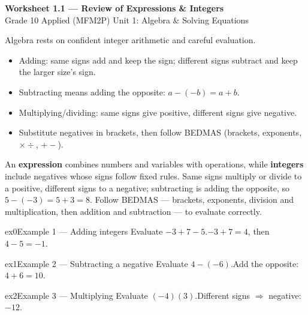 \documentclass[11pt]{article}
\begin{document}
\begin{center}
{\LARGE\bfseries\color{titleblue}Worksheet 1.1 --- Review of Expressions \& Integers}\\[2pt]
{\small Grade 10 Applied (MFM2P) \textperiodcentered{} Unit 1: Algebra \& Solving Equations}
\end{center}

\begin{ideabox}
Algebra rests on confident integer arithmetic and careful evaluation.
\begin{itemize}[leftmargin=*,itemsep=2pt]
  \item Adding: same signs add and keep the sign; different signs subtract and keep the larger size's sign.
  \item Subtracting means adding the opposite: $a-(-b)=a+b$.
  \item Multiplying/dividing: same signs give positive, different signs give negative.
  \item Substitute negatives in brackets, then follow BEDMAS (brackets, exponents, $\times\div$, $+-$).
\end{itemize}
\end{ideabox}

\begin{learnbox}
An \textbf{expression} combines numbers and variables with operations, while \textbf{integers} include negatives whose signs follow fixed rules.
Same signs multiply or divide to a positive, different signs to a negative; subtracting is adding the opposite, so $5-(-3)=5+3=8$.
Follow BEDMAS — brackets, exponents, division and multiplication, then addition and subtraction — to evaluate correctly.
\end{learnbox}


\begin{example}{ex0}{Example 1 --- Adding integers}
Evaluate $-3+7-5$.\soln $-3+7=4$, then $4-5=-1$.
\end{example}

\begin{example}{ex1}{Example 2 --- Subtracting a negative}
Evaluate $4-(-6)$.\soln Add the opposite: $4+6=10$.
\end{example}

\begin{example}{ex2}{Example 3 --- Multiplying}
Evaluate $(-4)(3)$.\soln Different signs $\Rightarrow$ negative: $-12$.
\end{example}
\end{document}

